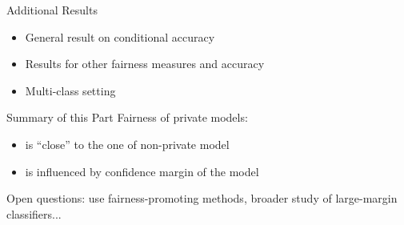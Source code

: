 \documentclass[17pt,aspectratio=169]{beamer}
\begin{document}
\begin{frame}{Additional Results}
  \begin{itemize}
  \item General result on conditional accuracy
  \item Results for other fairness measures and accuracy
  \item Multi-class setting
  \end{itemize}
\end{frame}

\begin{frame}{Summary of this Part}
  Fairness of private models:
  \begin{itemize}
  \item is ``close'' to the one of non-private model
  \item is influenced by confidence margin of the model
  \end{itemize}

  \vspace{1em}

  Open questions: use fairness-promoting methods, broader study of
  large-margin classifiers...
\end{frame}



\end{document}
